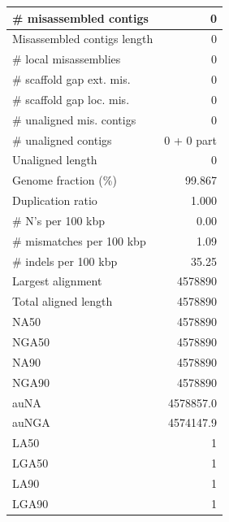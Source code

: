 \documentclass[12pt,a4paper]{article}
\begin{document}
\begin{table}[ht]
\begin{center}
\begin{tabular}{|l*{1}{|r}|}
\# misassembled contigs & 0 \\ \hline
Misassembled contigs length & 0 \\ \hline
\# local misassemblies & 0 \\ \hline
\# scaffold gap ext. mis. & 0 \\ \hline
\# scaffold gap loc. mis. & 0 \\ \hline
\# unaligned mis. contigs & 0 \\ \hline
\# unaligned contigs & 0 + 0 part \\ \hline
Unaligned length & 0 \\ \hline
Genome fraction (\%) & 99.867 \\ \hline
Duplication ratio & 1.000 \\ \hline
\# N's per 100 kbp & 0.00 \\ \hline
\# mismatches per 100 kbp & 1.09 \\ \hline
\# indels per 100 kbp & 35.25 \\ \hline
Largest alignment & 4578890 \\ \hline
Total aligned length & 4578890 \\ \hline
NA50 & 4578890 \\ \hline
NGA50 & 4578890 \\ \hline
NA90 & 4578890 \\ \hline
NGA90 & 4578890 \\ \hline
auNA & 4578857.0 \\ \hline
auNGA & 4574147.9 \\ \hline
LA50 & 1 \\ \hline
LGA50 & 1 \\ \hline
LA90 & 1 \\ \hline
LGA90 & 1 \\ \hline
\end{tabular}
\end{center}
\end{table}
\end{document}
